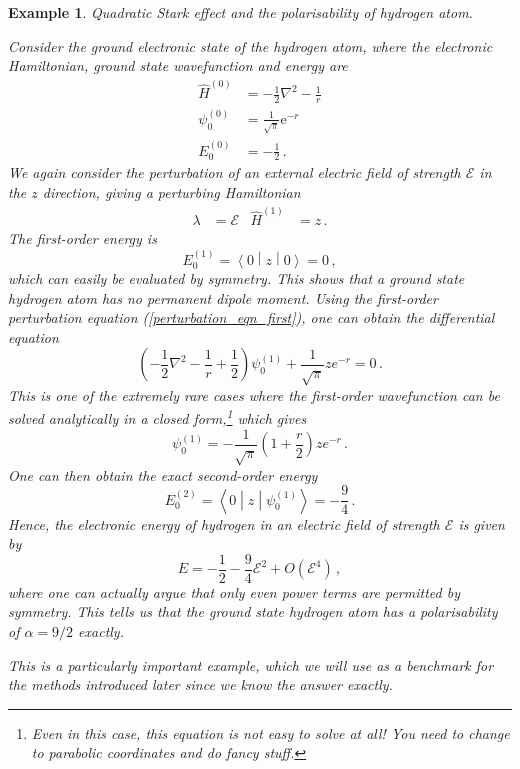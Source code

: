 \documentclass{article}
\theoremstyle{plain}\theoremheaderfont{\normalfont\itshape}\theorembodyfont{\rmfamily}\theoremseparator{.}\newtheorem*{rem}{Remark}\newtheorem*{ex}{Example}\newtheorem*{proof}{Proof}\newtheorem*{altp}{Alternative proof}
\theoremstyle{plain}\theoremheaderfont{\normalfont\bfseries}\theorembodyfont{\rmfamily}\theoremseparator{.}\newtheorem{thm}{Theorem}[section]\newtheorem{lem}[thm]{Lemma}\newtheorem{prop}[thm]{Proposition}\newtheorem*{cor}{Corollary}\newtheorem{defn}[thm]{Definition}\newtheorem{clm}[thm]{Claim}\newtheorem{clminproof}{Claim}
\theoremstyle{break}\theoremheaderfont{\normalfont\itshape}\theorembodyfont{\rmfamily}\theoremseparator{.\medskip}\newtheorem*{proofskip}{Proof}\newtheorem*{exs}{Examples}\newtheorem*{rems}{Remarks}
\theoremstyle{break}\theoremheaderfont{\normalfont\bfseries}\theorembodyfont{\rmfamily}\theoremseparator{.\medskip}\newtheorem{lemskip}[thm]{Lemma}\newtheorem{defnskip}[thm]{Definition}\newtheorem{propskip}[thm]{Proposition}\newtheorem{thmskip}[thm]{Theorem}
\numberwithin{equation}{section}
\newcommand{\ee}{\mathrm{e}}
\newcommand{\mel}[3]{\left\langle #1 \middle| #2 \middle| #3 \right\rangle}
\newcommand{\expval}[2]{\left\langle #2 \middle| #1 \middle| #2 \right\rangle}
\newcommand{\laplacian}{\nabla^2}
\begin{document}
    \begin{ex}
        \textit{Quadratic Stark effect and the polarisability of hydrogen atom.}

        Consider the ground electronic state of the hydrogen atom, where the electronic Hamiltonian, ground state wavefunction and energy are
        \begin{align}
            \hat{H}^{(0)}&=-\frac{1}{2}\laplacian-\frac{1}{r}\\
            \psi_0^{(0)}&=\frac{1}{\sqrt{\pi}}\ee^{-r}\\
            E_0^{(0)}&=-\frac{1}{2}\,.
        \end{align}
        We again consider the perturbation of an external electric field of strength \(\mathcal{E}\) in the \(z\) direction, giving a perturbing Hamiltonian
        \begin{align}
            \lambda&=\mathcal{E} & \hat{H}^{(1)}&=z\,.
        \end{align}
        The first-order energy is
        \begin{equation}
            E_0^{(1)}=\expval{z}{0}=0\,,
        \end{equation}
        which can easily be evaluated by symmetry. This shows that a ground state hydrogen atom has no permanent dipole moment. Using the first-order perturbation equation (\ref{perturbation_eqn_first}), one can obtain the differential equation
        \begin{equation}
            \left(-\frac{1}{2}\laplacian-\frac{1}{r}+\frac{1}{2}\right)\psi_0^{(1)}+\frac{1}{\sqrt{\pi}}ze^{-r}=0\,.
        \end{equation}
        This is one of the extremely rare cases where the first-order wavefunction can be solved analytically in a closed form,\footnote{Even in this case, this equation is not easy to solve at all! You need to change to parabolic coordinates and do fancy stuff.} which gives
        \begin{equation}
            \psi_0^{(1)}=-\frac{1}{\sqrt{\pi}}\left(1+\frac{r}{2}\right)ze^{-r}\,.
        \end{equation}
        One can then obtain the exact second-order energy
        \begin{equation}
            E_0^{(2)}=\mel{0}{z}{\psi_0^{(1)}}=-\frac{9}{4}\,.
        \end{equation}
        Hence, the electronic energy of hydrogen in an electric field of strength \(\mathcal{E}\) is given by
        \begin{equation}
            E=-\frac{1}{2}-\frac{9}{4}\mathcal{E}^2+O(\mathcal{E}^4)\,,
        \end{equation}
        where one can actually argue that only even power terms are permitted by symmetry. This tells us that the ground state hydrogen atom has a polarisability of \(\alpha=9/2\) exactly.

        This is a particularly important example, which we will use as a benchmark for the methods introduced later since we know the answer exactly.
    \end{ex}
\end{document}
